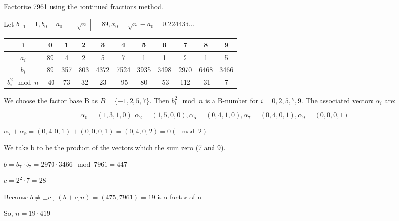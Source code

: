 \documentclass[a4paper,12pt]{article}
\author{Roland Szabo, gr. 235}
\begin{document}
Factorize 7961 using the continued fractions method. 

Let $ b_{-1} = 1, b_0 = a_0 = \left \lceil{\sqrt{n}}\right \rceil = 89, x_0 = \sqrt{n} - a_0 = 0.224436... $


\begin{tabular}{ | c | c |  c | c | c | c | c | c | c | c | c | }
  \hline                        
  i & 0 & 1 & 2 & 3 & 4 & 5 & 6 & 7 & 8 & 9\\
  \hline
  $a_i$ & 89 & 4 & 2 & 5 & 7 & 1 & 1 & 2 & 1 & 5\\
  \hline
  $b_i$ & 89 & 357 & 803 & 4372 & 7524 & 3935 & 3498 & 2970 & 6468 & 3466\\
  \hline
  $b_i^2 \mod n $ & -40 & 73 & -32 & 23 & -95 & 80 & -53 & 112 & -31 & 7\\
  \hline  
\end{tabular}

We choose the factor base B as $ B = \{ -1, 2, 5, 7 \} $. Then $ b_i^2 \mod n $ is a B-number for $ i = 0, 2, 5, 7, 9 $. The associated vectors $ \alpha_i $ are:

$$
\alpha_0 = ( 1, 3, 1, 0), \alpha_2 = ( 1, 5, 0, 0), \alpha_5 = ( 0, 4, 1, 0), 
\alpha_7 = (0, 4, 0, 1), \alpha_9 = (0, 0, 0, 1) 
$$

$ \alpha_7 + \alpha_9 = (0, 4, 0, 1) + (0, 0, 0, 1) = (0, 4, 0, 2) =  0 (\mod 2) $

We take b to be the product of the vectors which the sum zero (7 and 9).

$ b = b_7 \cdot b_7 = 2970 \cdot 3466 \mod 7961 = 447 $

$ c = 2^2 \cdot 7 = 28 $

Because $ b \neq \pm c $ , $ (b + c, n) = (475, 7961) = 19 $ is a factor of n.

So, $ n = 19 \cdot 419 $
\end{document}

